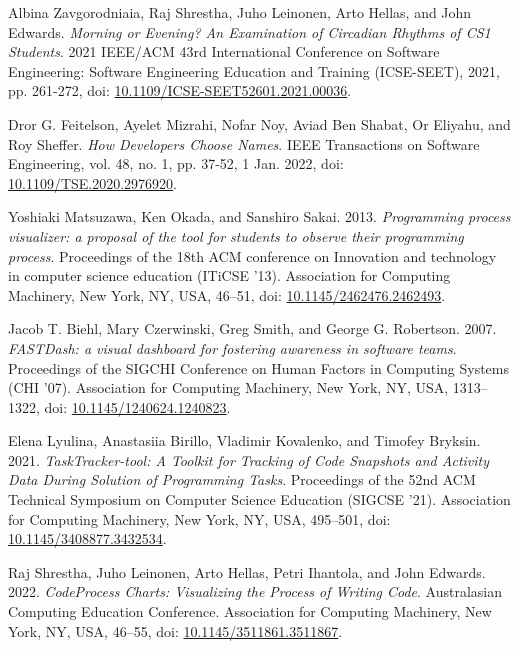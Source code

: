 \begin{thebibliography}{99}

 Albina Zavgorodniaia, Raj Shrestha, Juho Leinonen, Arto Hellas, and John Edwards. \textit{Morning or Evening? An Examination of Circadian Rhythms of CS1 Students}. 2021 IEEE/ACM 43rd International Conference on Software Engineering: Software Engineering Education and Training (ICSE-SEET), 2021, pp. 261-272, doi: \href{https://doi.org/10.1109/ICSE-SEET52601.2021.00036}{10.1109/ICSE-SEET52601.2021.00036}.

 Dror G. Feitelson, Ayelet Mizrahi, Nofar Noy, Aviad Ben Shabat, Or Eliyahu, and Roy Sheffer. \textit{How Developers Choose Names}. IEEE Transactions on Software Engineering, vol. 48, no. 1, pp. 37-52, 1 Jan. 2022, doi: \href{https://doi.org/10.1109/TSE.2020.2976920}{10.1109/TSE.2020.2976920}.

 Yoshiaki Matsuzawa, Ken Okada, and Sanshiro Sakai. 2013. \textit{Programming process visualizer: a proposal of the tool for students to observe their programming process}. Proceedings of the 18th ACM conference on Innovation and technology in computer science education (ITiCSE '13). Association for Computing Machinery, New York, NY, USA, 46–51, doi: \href{https://doi.org/10.1145/2462476.2462493}{10.1145/2462476.2462493}.

 Jacob T. Biehl, Mary Czerwinski, Greg Smith, and George G. Robertson. 2007. \textit{FASTDash: a visual dashboard for fostering awareness in software teams}. Proceedings of the SIGCHI Conference on Human Factors in Computing Systems (CHI '07). Association for Computing Machinery, New York, NY, USA, 1313–1322, doi: \href{https://doi.org/10.1145/1240624.1240823}{10.1145/1240624.1240823}.

 Elena Lyulina, Anastasiia Birillo, Vladimir Kovalenko, and Timofey Bryksin. 2021. \textit{TaskTracker-tool: A Toolkit for Tracking of Code Snapshots and Activity Data During Solution of Programming Tasks}. Proceedings of the 52nd ACM Technical Symposium on Computer Science Education (SIGCSE '21). Association for Computing Machinery, New York, NY, USA, 495–501, doi: \href{https://doi.org/10.1145/3408877.3432534}{10.1145/3408877.3432534}.

 Raj Shrestha, Juho Leinonen, Arto Hellas, Petri Ihantola, and John Edwards. 2022. \textit{CodeProcess Charts: Visualizing the Process of Writing Code}. Australasian Computing Education Conference. Association for Computing Machinery, New York, NY, USA, 46–55, doi: \href{https://doi.org/10.1145/3511861.3511867}{10.1145/3511861.3511867}.


\end{thebibliography}
